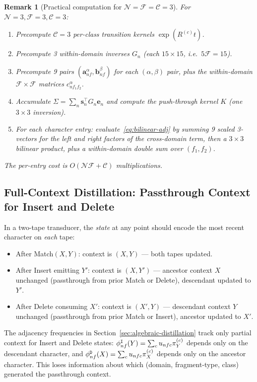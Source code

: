 \documentclass{article}
\newtheorem{remark}{Remark}
\newcommand\dom{n}
\newcommand\ndom{\mathcal{N}}
\newcommand\nfrag{\mathcal{F}}
\newcommand\classdist{u}
\newcommand\eqm{\pi}
\providecommand\revsub{R}
\newcommand\evoltime{t}
\newcommand\ins{{\tt I}}
\newcommand\del{{\tt D}}
\newcommand\frag{f}
\newcommand\class{c}
\newcommand\nclasses{\mathcal{C}}
\begin{document}
\begin{remark}[Practical computation for $\ndom = \nfrag = \nclasses = 3$]
For $\ndom = 3, \nfrag = 3, \nclasses = 3$:
\begin{enumerate}
\item Precompute $\nclasses = 3$ per-class transition kernels
  $\exp(\revsub^{(\class)}\evoltime)$.
\item Precompute 3 within-domain inverses $G_\dom$ (each
  $15 \times 15$, i.e.\ $5\nfrag = 15$).
\item Precompute 9 pairs $(\mathbf{a}^\alpha_{\dom\frag},
  \mathbf{b}^\beta_{\dom\frag})$ for each $(\alpha,\beta)$ pair, plus
  the within-domain $\nfrag \times \nfrag$ matrices
  $c^\alpha_{\dom\frag_1\frag_2}$.
\item Accumulate $\Sigma = \sum_\dom \mathbf{s}_\dom^\top G_\dom \mathbf{e}_\dom$
  and compute the push-through kernel $K$ (one $3 \times 3$ inversion).
\item For each character entry: evaluate~\eqref{eq:bilinear-adj} by
  summing 9 scaled 3-vectors for the left and right factors of the
  cross-domain term, then a $3 \times 3$ bilinear product, plus a
  within-domain double sum over $(\frag_1, \frag_2)$.
\end{enumerate}
The per-entry cost is $O(\ndom\nfrag + \nclasses)$ multiplications.
\end{remark}


\subsection{Full-Context Distillation: Passthrough Context for Insert and Delete}
\label{sec:full-context}

In a two-tape transducer, the \emph{state} at any point should encode
the most recent character on \emph{each} tape:
\begin{itemize}
\item After Match$(X,Y)$: context is $(X,Y)$ --- both tapes updated.
\item After Insert emitting $Y'$: context is $(X, Y')$ --- ancestor context $X$ unchanged
  (passthrough from prior Match or Delete), descendant updated to $Y'$.
\item After Delete consuming $X'$: context is $(X', Y)$ --- descendant context $Y$ unchanged
  (passthrough from prior Match or Insert), ancestor updated to $X'$.
\end{itemize}

The adjacency frequencies in
Section~\ref{sec:algebraic-distillation} track only partial context
for Insert and Delete states: $\phi^{\ins}_{\dom\frag}(Y)
= \sum_\class \classdist_{\dom\frag\class} \eqm^{(\class)}_Y$
depends only on the descendant character, and
$\phi^{\del}_{\dom\frag}(X) = \sum_\class \classdist_{\dom\frag\class}
\eqm^{(\class)}_X$ depends only on the ancestor character.
This loses information about which (domain, fragment-type, class)
generated the passthrough context.
\end{document}
